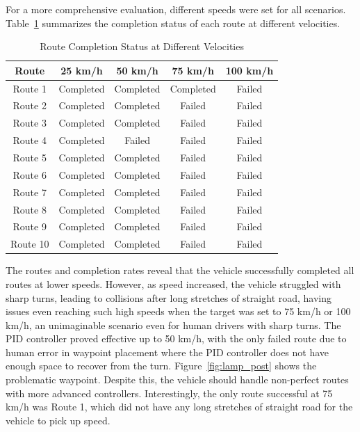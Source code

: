 \documentclass[conference]{IEEEtran}
\begin{document}
For a more comprehensive evaluation, different speeds were set for all scenarios. Table~\ref{tab:completion_status} summarizes the completion status of each route at different velocities.

\begin{table}[H]
    \centering
    \caption{Route Completion Status at Different Velocities}
    \begin{tabular}{|c|c|c|c|c|}
        \hline
        \textbf{Route} & \textbf{25 km/h} & \textbf{50 km/h} & \textbf{75 km/h} & \textbf{100 km/h} \\
        \hline
        Route 1 & Completed & Completed & Completed & Failed \\
        \hline
        Route 2 & Completed & Completed & Failed & Failed \\
        \hline
        Route 3 & Completed & Completed & Failed & Failed \\
        \hline
        Route 4 & Completed & Failed & Failed & Failed \\
        \hline
        Route 5 & Completed & Completed & Failed & Failed \\
        \hline
        Route 6 & Completed & Completed & Failed & Failed \\
        \hline
        Route 7 & Completed & Completed & Failed & Failed \\
        \hline
        Route 8 & Completed & Completed & Failed & Failed \\
        \hline
        Route 9 & Completed & Completed & Failed & Failed \\
        \hline
        Route 10 & Completed & Completed & Failed & Failed \\
        \hline
    \end{tabular}
    \label{tab:completion_status}
\end{table}

The routes and completion rates reveal that the vehicle successfully completed all routes at lower speeds. However, as speed increased, the vehicle struggled with sharp turns, leading to collisions after long stretches of straight road, having issues even reaching such high speeds when the target was set to 75 km/h or 100 km/h, an unimaginable scenario even for human drivers with sharp turns. The PID controller proved effective up to 50 km/h, with the only failed route due to human error in waypoint placement where the PID controller does not have enough space to recover from the turn. Figure~\ref{fig:lamp_post} shows the problematic waypoint. Despite this, the vehicle should handle non-perfect routes with more advanced controllers. Interestingly, the only route successful at 75 km/h was Route 1, which did not have any long stretches of straight road for the vehicle to pick up speed.
\end{document}
